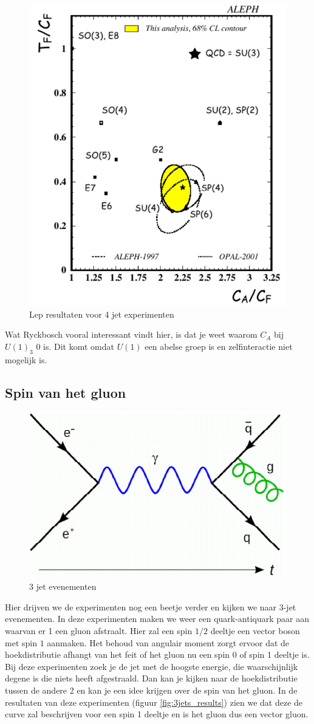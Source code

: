 \documentclass[../main.tex]{subfiles}
\begin{document}
\begin{figure}[h]
    \centering
    \includegraphics[width=0.4\linewidth]{QCD/4jets_results.png}
    \caption{Lep resultaten voor 4 jet experimenten}%
    \label{fig:4jets_results}
\end{figure}

{\color{red} Wat Ryckbosch vooral interessant vindt hier, is dat je weet waarom $C_A$ bij $U(1)_3$ 0 is. Dit komt omdat $U(1)$ een abelse groep is en zelfinteractie niet mogelijk is.}

\subsection{Spin van het gluon}%
\label{sub:spin_van_het_gluon}

\begin{figure}[h]
    \centering
    \includegraphics[width=0.4\linewidth]{QCD/3jets.png}
    \caption{3 jet evenementen}%
    \label{fig:3jets}
\end{figure}

Hier drijven we de experimenten nog een beetje verder en kijken we naar 3-jet evenementen. In deze experimenten maken we weer een quark-antiquark paar aan waarvan er 1 een gluon afstraalt. Hier zal een spin $1/2$ deeltje een vector boson met spin $1$ aanmaken. Het behoud van angulair moment zorgt ervoor dat de hoekdistributie afhangt van het feit of het gluon nu een spin 0 of spin 1 deeltje is.
Bij deze experimenten zoek je de jet met de hoogste energie, die waarschijnlijk degene is die niets heeft afgestraald. Dan kan je kijken naar de hoekdistributie tussen de andere 2 en kan je een idee krijgen over de spin van het gluon. In de resultaten van deze experimenten (figuur \ref{fig:3jets_results}) zien we dat deze de curve zal beschrijven voor een spin 1 deeltje en is het gluon dus een vector gluon.
\end{document}
